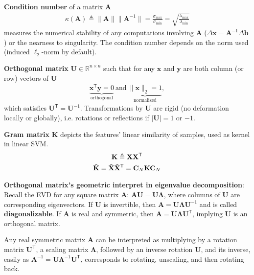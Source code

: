 \textbf{Condition number} of a matrix $\mathbf{A}$
\begin{gather}
    \kappa(\mathbf{A})
    \triangleq \|\mathbf{A}\|\|\mathbf{A}^{-1}\|
    = \frac{\sigma_{\text{max}}}{\sigma_{\text{min}}}
    = \sqrt{\frac{\lambda_{\text{max}}}{\lambda_{\text{min}}}}
\end{gather}
measures the numerical stability of any computations involving $\mathbf{A}$ ($\Delta\bm{x}=\mathbf{A}^{-1}\Delta\bm{b}$) 
or the nearness to singularity.
The condition number depends on the norm used (induced $\ell_2$-norm by default).

\textbf{Orthogonal matrix} $\mathbf{U}\in\mathbb{R}^{n\times n}$ such that 
for any $\bm{x}$ and $\bm{y}$ are both column (or row) vectors of $\mathbf{U}$
\begin{gather}
    \underbrace{\bm{x}^\mathsf{T}\bm{y}=0}_{\text{orthogonal}}
    ~\text{and}~
    \underbrace{\|\bm{x}\|_2=1}_{\text{normalized}},
\end{gather}
which satisfies $\mathbf{U}^\mathsf{T}=\mathbf{U}^{-1}$.
Transformations by $\mathbf{U}$ are rigid (no deformation locally or globally), 
i.e. rotations or reflections if $|\mathbf{U}|=1$ or $-1$.

\textbf{Gram matrix} $\mathbf{K}$ depicts the features' linear similarity of samples, used as kernel in linear SVM.
\begin{gather}
    \mathbf{K}\triangleq\mathbf{XX}^\mathsf{T}\\
    \Tilde{\mathbf{K}}=\Tilde{\mathbf{X}}\Tilde{\mathbf{X}}^\mathsf{T}=\mathbf{C}_N\mathbf{KC}_N
\end{gather}

\textbf{Orthogonal matrix's geometric interpret in eigenvalue decomposition}:
Recall the EVD for any square matrix $\mathbf{A}$: $\mathbf{AU}=\mathbf{U\Lambda}$,
where columns of $\mathbf{U}$ are corresponding eigenvectors.
If $\mathbf{U}$ is invertible, then $\mathbf{A}=\mathbf{U\Lambda U}^{-1}$ and is called \textbf{diagonalizable}.
If $\mathbf{A}$ is real and symmetric, then $\mathbf{A}=\mathbf{U\Lambda U}^\mathsf{T}$, 
implying $\mathbf{U}$ is an orthogonal matrix.

Any real symmetric matrix $\mathbf{A}$ can be interpreted as multiplying by 
a rotation matrix $\mathbf{U}^\mathsf{T}$, a scaling matrix $\mathbf{\Lambda}$, followed by an inverse rotation $\mathbf{U}$,
and its inverse, easily as $\mathbf{A}^{-1}=\mathbf{U\Lambda}^{-1}\mathbf{U}^\mathsf{T}$, 
corresponds to rotating, unscaling, and then rotating back.

